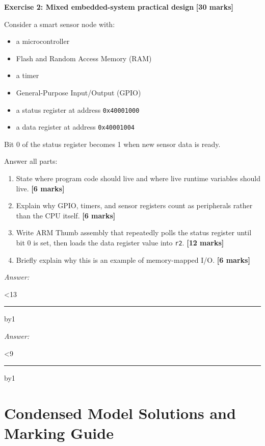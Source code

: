 \documentclass[11pt,a4paper]{article}
\newcommand{\qmarks}[1]{\hfill{\textbf{[#1 marks]}}}
\newcommand{\answerlines}[1]{
  \par\smallskip\noindent\textit{Answer:}\par\nobreak
  \answerlinecount=0
  \loop\ifnum\answerlinecount<#1
    \par\noindent\rule{\linewidth}{0.4pt}\vspace{0.95\baselineskip}
    \advance\answerlinecount by1
  \repeat
  \par\smallskip
}
\newcommand{\largeanswer}{\answerlines{9}}
\newcommand{\xlargeanswer}{\answerlines{13}}
\begin{document}
\textbf{Exercise 2: Mixed embedded-system practical design} \qmarks{30}

Consider a smart sensor node with:
\begin{itemize}[leftmargin=1.5em]
\item a microcontroller
\item Flash and Random Access Memory (RAM)
\item a timer
\item General-Purpose Input/Output (GPIO)
\item a status register at address \texttt{0x40001000}
\item a data register at address \texttt{0x40001004}
\end{itemize}

Bit 0 of the status register becomes 1 when new sensor data is ready.

Answer all parts:
\begin{enumerate}[label=\alph*)]
\item State where program code should live and where live runtime variables should live. \qmarks{6}
\item Explain why GPIO, timers, and sensor registers count as peripherals rather than the CPU itself. \qmarks{6}
\item Write ARM Thumb assembly that repeatedly polls the status register until bit 0 is set, then loads the data register value into \texttt{r2}. \qmarks{12}
\item Briefly explain why this is an example of memory-mapped I/O. \qmarks{6}
\end{enumerate}
\xlargeanswer
\largeanswer

\newpage
\section*{Condensed Model Solutions and Marking Guide}

\begin{center}
\end{center}
\end{document}
